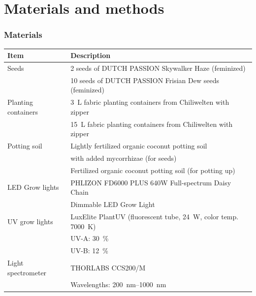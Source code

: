 \documentclass[
    12pt,
    aspectratio=1610,
    b,
    bibliography=../bibliography.bib,
    link-citations]{beamer}
\begin{document}
    \section{Materials and methods}

    \begin{frame}
        \frametitle{Materials}
        \footnotesize
        \begin{tabular}{ll}
            Item & Description \\
            \midrule
            Seeds               & 2 seeds of DUTCH PASSION Skywalker Haze (feminized) \\
                                & 10 seeds of DUTCH PASSION Frisian Dew seeds (feminized) \\
            \addlinespace
            Planting containers & \qty[mode=text]{3}{\L} fabric planting containers from Chiliwelten with zipper \\
                                & \qty[mode=text]{15}{\L} fabric planting containers from Chiliwelten with zipper \\
            \addlinespace
            Potting soil        & Lightly fertilized organic coconut potting soil \\
                                & with added mycorrhizae (for seeds) \\
                                & Fertilized organic coconut potting soil (for potting up) \\
            \addlinespace
            LED Grow lights     & PHLIZON FD6000 PLUS 640W Full-spectrum Daisy Chain \\
                                & Dimmable LED Grow Light \\
            \addlinespace
            UV grow lights      & LuxElite PlantUV (fluorescent tube, \qty[mode=text]{24}{\W}, color temp. \qty[mode=text]{7000}{\K}) \\
                                & \quad UV-A: \qty[mode=text]{30}{\percent} \\
                                & \quad UV-B: \qty[mode=text]{12}{\percent} \\
            \addlinespace
            Light spectrometer  & THORLABS CCS200/M \\
                                & \quad Wavelengths: \qtyrange[mode=text, range-phrase=\textendash, range-units=single]{200}{1000}{\nm} \\
        \end{tabular}
    \end{frame}
\end{document}
